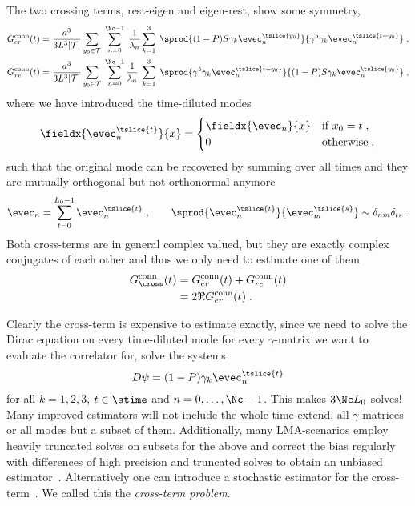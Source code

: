 The two crossing terms, rest-eigen and eigen-rest, show some symmetry,
\begin{align}
G_{er}^{\text{conn}}(t) &=
\frac{a^{3}}{3 L^{3} \lvert \mathcal{T} \rvert}
\sum_{y_0 \in \mathcal{T}} \;
\sum_{n=0}^{\Nc-1} \; \frac{1}{\lambda_{n}}
\sum_{k=1}^{3} \;
\sprod{
  (1-P) S
  \gamma_k
  \evec_{n}^{\tslice{y_0}}
}{
  \gamma^{5}
  \gamma_k
  \evec_{n}^{\tslice{t+y_0}}
} \;, \\
G_{re}^{\text{conn}}(t) &=
\frac{a^{3}}{3 L^{3} \lvert \mathcal{T} \rvert}
\sum_{y_0 \in \mathcal{T}} \;
\sum_{n=0}^{\Nc-1} \frac{1}{\lambda_{n}} \;
\sum_{k=1}^{3} \;
\sprod{
  \gamma^{5}
  \gamma_k
  \evec_{n}^{\tslice{t+y_0}}
}{
  (1-P) S
  \gamma_k
  \evec_{n}^{\tslice{y_0}}
} \;,
\end{align}
where we have introduced the time-diluted modes
\begin{equation}
\fieldx{\evec_{n}^{\tslice{t}}}{x} =
\begin{cases}
  \fieldx{\evec_{n}}{x} & \text{if } x_0 = t \;, \\
  0 & \text{otherwise} \;,
\end{cases} 
\end{equation}
such that the original mode can be recovered by summing over all times and they are mutually orthogonal but not orthonormal anymore
\begin{equation}
\evec_{n} = \sum_{t=0}^{L_0-1} \evec_{n}^{\tslice{t}} \;,
\qquad
\sprod{\evec_{n}^{\tslice{t}}}{\evec_{m}^{\tslice{s}}} \sim \delta_{nm} \delta_{ts} \;.
\end{equation}
Both cross-terms are in general complex valued, but they are exactly complex conjugates of each other and thus we only need to estimate one of them
\begin{align}
G_{\cross}^{\text{conn}}(t)
&= G_{er}^{\text{conn}}(t) + G_{re}^{\text{conn}}(t) \\
&= 2 \Re{G_{er}^{\text{conn}}(t)} \;.
\end{align}

Clearly the cross-term is expensive to estimate exactly, since we need to solve the Dirac equation on every time-diluted mode for every $\gamma$-matrix we want to evaluate the correlator for, \ie solve the systems
\begin{equation}
D \psi = (1-P) \gamma_k \evec_{n}^{\tslice{t}}
\end{equation}
for all $k = 1,2,3$, $t \in \stime$ and $n = 0, \ldots, \Nc-1$.
This makes $3 \Nc L_0$ solves!
Many improved estimators will not include the whole time extend, all $\gamma$-matrices or all modes but a subset of them.
Additionally, many LMA-scenarios employ heavily truncated solves on subsets for the above and correct the bias regularly with differences of high precision and truncated solves to obtain an unbiased estimator~\cite{bmw_2017,Kuberski_2023}.
Alternatively one can introduce a stochastic estimator for the cross-term~\cite{lynch2023,fermi_2023}.
We called this the \emph{cross-term problem}.

